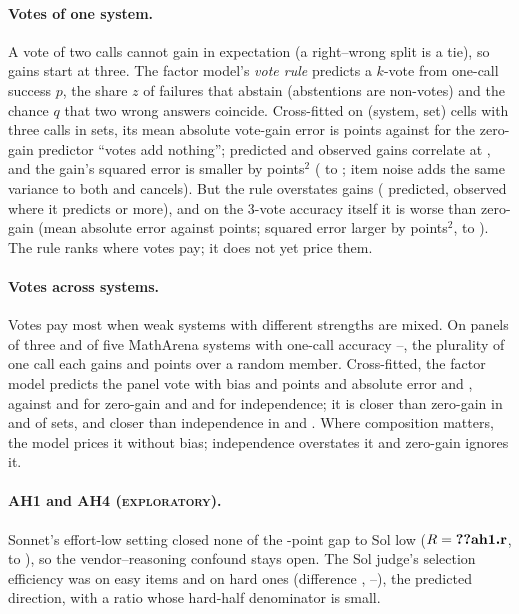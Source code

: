 \documentclass{article}
\newcommand{\status}[1]{{\upshape\textsc{\small #1}}}
\begin{document}
\paragraph{Votes of one system.} A vote of two calls cannot gain in expectation (a right--wrong split is a tie), so gains
start at three. The factor model's \emph{vote rule} predicts a $k$-vote from one-call success $p$, the share $z$ of
failures that abstain (abstentions are non-votes) and the chance $q$ that two wrong answers coincide. Cross-fitted on
 (system, set) cells with three calls in  sets, its mean absolute vote-gain error is
 points against  for the zero-gain predictor ``votes add nothing''; predicted and
observed gains correlate at , and the gain's squared error is smaller by  points$^2$
( to ; item noise adds the same variance to both and cancels). But the rule
overstates gains ( predicted,  observed where it predicts 
or more), and on the 3-vote accuracy itself it is worse than zero-gain (mean absolute error  against
 points; squared error larger by  points$^2$,  to
). The rule ranks where votes pay; it does not yet price them.

\paragraph{Votes across systems.} Votes pay most when weak systems with different strengths are mixed. On
 panels of three and  of five MathArena systems with one-call accuracy
--, the plurality of one call each gains  and  points
over a random member. Cross-fitted, the factor model predicts the panel vote with bias  and
 points and absolute error  and , against  and
 for zero-gain and  and  for independence; it is closer than zero-gain in
 and  of  sets, and closer than independence in
 and . Where composition matters, the model prices it without bias;
independence overstates it and zero-gain ignores it.

\paragraph{AH1 and AH4 (\status{exploratory}).} Sonnet's effort-low setting closed none of the
-point gap to Sol low ($R = \nm{ah1.r}$,  to ), so the vendor--reasoning confound stays
open. The Sol judge's selection efficiency was  on easy items and  on hard ones (difference
, --), the predicted direction, with a ratio whose hard-half denominator is small.
\end{document}
